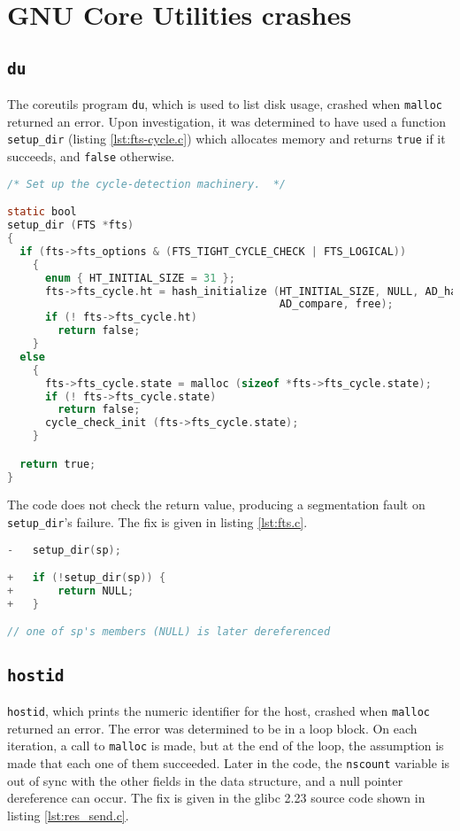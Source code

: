 \section{GNU Core Utilities crashes}
\label{appendix:coreutils}
\subsection{\texttt{du}}
The coreutils program \texttt{du}, which is used to list disk usage, crashed when \texttt{malloc} returned an error. Upon investigation, it was determined to have used a function \texttt{setup\_dir} (listing \ref{lst:fts-cycle.c}) which allocates memory and returns \texttt{true} if it succeeds, and \texttt{false} otherwise.

\begin{lstlisting}[label={lst:fts-cycle.c},firstnumber=47, caption={\texttt{lib/fts-cycle.c}}, language=C]
/* Set up the cycle-detection machinery.  */

static bool
setup_dir (FTS *fts)
{
  if (fts->fts_options & (FTS_TIGHT_CYCLE_CHECK | FTS_LOGICAL))
    {
      enum { HT_INITIAL_SIZE = 31 };
      fts->fts_cycle.ht = hash_initialize (HT_INITIAL_SIZE, NULL, AD_hash,
                                           AD_compare, free);
      if (! fts->fts_cycle.ht)
        return false;
    }
  else
    {
      fts->fts_cycle.state = malloc (sizeof *fts->fts_cycle.state);
      if (! fts->fts_cycle.state)
        return false;
      cycle_check_init (fts->fts_cycle.state);
    }

  return true;
}
\end{lstlisting}

The code does not check the return value, producing a segmentation fault on \texttt{setup\_dir}'s failure.
 The fix is given in listing \ref{lst:fts.c}.
\begin{lstlisting}[label={lst:fts.c},firstnumber=986, caption={\texttt{lib/fts.c}}, language=C]
-	setup_dir(sp);

+	if (!setup_dir(sp)) {
+		return NULL;
+	}

// one of sp's members (NULL) is later dereferenced
\end{lstlisting}

\subsection{\texttt{hostid}}
\texttt{hostid}, which prints the numeric identifier for the host, crashed when \texttt{malloc} returned an error. The error was determined to be in a loop block. On each iteration, a call to \texttt{malloc} is made, but at the end of the loop, the assumption is made that each one of them succeeded. Later in the code, the \texttt{nscount} variable is out of sync with the other fields in the data structure, and a null pointer dereference can occur. The fix is given in the glibc 2.23 source code shown in listing \ref{lst:res_send.c}.

